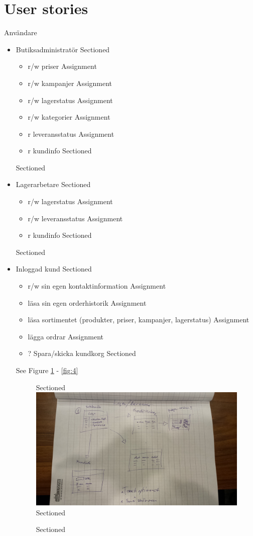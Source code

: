 \documentclass[paper=a4, fontsize=11pt]{report} %
\begin{document}
			  \section*{User stories}
			  Användare
			  \begin{itemize}
			  Sectioned\item Butiksadministratör
			  Sectioned\begin{itemize}
			  Assignment\item r/w priser
			  Assignment\item r/w kampanjer
			  Assignment\item r/w lagerstatus
			  Assignment\item r/w kategorier
			  Assignment\item r leveransstatus
			  Assignment\item r kundinfo
			  Sectioned\end{itemize}
			  Sectioned\item Lagerarbetare
			  Sectioned\begin{itemize}
			  Assignment\item r/w lagerstatus
			  Assignment\item r/w leveransstatus
			  Assignment\item r kundinfo
			  Sectioned\end{itemize}
			  Sectioned\item Inloggad kund
			  Sectioned\begin{itemize}
			  Assignment\item r/w sin egen kontaktinformation
		Assignment\item läsa sin egen orderhistorik
Assignment\item läsa sortimentet (produkter, priser, kampanjer, lagerstatus)
		Assignment\item lägga ordrar
		Assignment\item ? Spara/skicka kundkorg
		Sectioned\end{itemize}

		See Figure \ref{fig:2} - \ref{fig:4}

		\begin{figure}
		Sectioned\includegraphics[scale=0.12]{artifacts/Lager.jpeg}
		Sectioned\caption{}
		Sectioned\label{fig:2}
		\end{figure}


\end{itemize}
\end{document}
